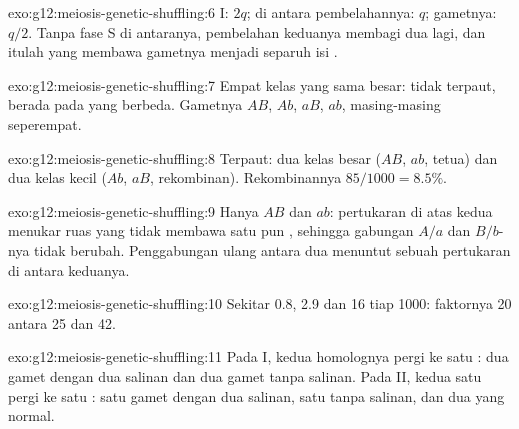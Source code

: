 \begin{solution}{exo:g12:meiosis-genetic-shuffling:6}
 I: $2q$; di antara pembelahannya: $q$; gametnya: $q/2$. Tanpa
fase S di antaranya, pembelahan keduanya membagi dua  lagi, dan
itulah yang membawa gametnya menjadi separuh isi  .
\end{solution}

\begin{solution}{exo:g12:meiosis-genetic-shuffling:7}
Empat kelas yang sama besar: tidak terpaut, berada pada  yang
berbeda. Gametnya $AB$, $Ab$, $aB$, $ab$, masing-masing seperempat.
\end{solution}

\begin{solution}{exo:g12:meiosis-genetic-shuffling:8}
Terpaut: dua kelas besar ($AB$, $ab$, tetua) dan dua kelas kecil ($Ab$,
$aB$, rekombinan). Rekombinannya $85/1000 = 8.5\%$.
\end{solution}

\begin{solution}{exo:g12:meiosis-genetic-shuffling:9}
Hanya $AB$ dan $ab$: pertukaran di atas kedua  menukar ruas yang
tidak membawa satu pun , sehingga gabungan $A/a$ dan $B/b$-nya
tidak berubah. Penggabungan ulang antara dua  menuntut sebuah
pertukaran di antara keduanya.
\end{solution}

\begin{solution}{exo:g12:meiosis-genetic-shuffling:10}
Sekitar 0.8, 2.9 dan 16 tiap 1000: faktornya 20 antara 25 dan 42.
\end{solution}

\begin{solution}{exo:g12:meiosis-genetic-shuffling:11}
Pada  I, kedua homolognya pergi ke satu : dua gamet dengan
dua salinan dan dua gamet tanpa salinan. Pada  II, kedua
 satu  pergi ke satu : satu gamet dengan dua
salinan, satu tanpa salinan, dan dua yang normal.
\end{solution}

